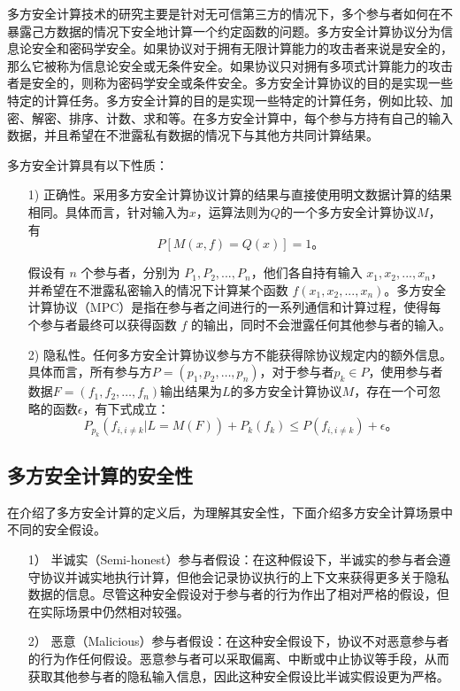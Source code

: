 多方安全计算技术的研究主要是针对无可信第三方的情况下，多个参与者如何在不暴露己方数据的情况下安全地计算一个约定函数的问题。多方安全计算协议分为信息论安全和密码学安全。如果协议对于拥有无限计算能力的攻击者来说是安全的，那么它被称为信息论安全或无条件安全。如果协议只对拥有多项式计算能力的攻击者是安全的，则称为密码学安全或条件安全。多方安全计算协议的目的是实现一些特定的计算任务。多方安全计算的目的是实现一些特定的计算任务，例如比较、加密、解密、排序、计数、求和等。在多方安全计算中，每个参与方持有自己的输入数据，并且希望在不泄露私有数据的情况下与其他方共同计算结果。

多方安全计算具有以下性质：

\begin{itemize}
	\item [1)]
	正确性。采用多方安全计算协议计算的结果与直接使用明文数据计算的结果相同。具体而言，针对输入为$x$，运算法则为$Q$的一个多方安全计算协议$M$，有
	$$P[M(x,f)=Q(x)]=1\text{。}$$
	
	假设有 $n$ 个参与者，分别为 $P_1, P_2, ..., P_n$，他们各自持有输入 $x_1, x_2, ..., x_n$，并希望在不泄露私密输入的情况下计算某个函数 $f(x_1, x_2, ..., x_n)$。多方安全计算协议（MPC）是指在参与者之间进行的一系列通信和计算过程，使得每个参与者最终可以获得函数 $f$ 的输出，同时不会泄露任何其他参与者的输入。
	\item [2)]
	隐私性。任何多方安全计算协议参与方不能获得除协议规定内的额外信息。具体而言，所有参与方$P=(p_1, p_2, \dots, p_n)$，对于参与者$p_k\in P$，使用参与者数据$F=(f_1, f_2, \dots, f_n)$输出结果为$L$的多方安全计算协议$M$，存在一个可忽略的函数$\epsilon$，有下式成立：
	$$P_{p_k}(f_{i,i\neq k}|L=M(F))+P_k(f_k)\leq P(f_{i,i\neq k})+\epsilon\text{。}$$
	
\end{itemize}


\subsection{多方安全计算的安全性}
在介绍了多方安全计算的定义后，为理解其安全性，下面介绍多方安全计算场景中不同的安全假设。

\begin{itemize}
	\item [1）]
	半诚实（Semi-honest）参与者假设：在这种假设下，半诚实的参与者会遵守协议并诚实地执行计算，但他会记录协议执行的上下文来获得更多关于隐私数据的信息。尽管这种安全假设对于参与者的行为作出了相对严格的假设，但在实际场景中仍然相对较强。
	\item [2）]
	恶意（Malicious）参与者假设：在这种安全假设下，协议不对恶意参与者的行为作任何假设。恶意参与者可以采取偏离、中断或中止协议等手段，从而获取其他参与者的隐私输入信息，因此这种安全假设比半诚实假设更为严格。
\end{itemize}

